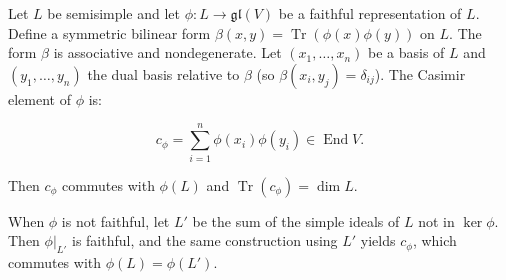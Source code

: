 Let $L$ be semisimple and let $\phi: L \rightarrow \mathfrak{gl}(V)$ be a faithful representation of $L$. Define a symmetric bilinear form $\beta(x, y) = \operatorname{Tr}(\phi(x)\phi(y))$ on $L$. The form $\beta$ is associative and nondegenerate. Let $(x_1, \ldots, x_n)$ be a basis of $L$ and $(y_1, \ldots, y_n)$ the dual basis relative to $\beta$ (so $\beta(x_i, y_j) = \delta_{ij}$). The Casimir element of $\phi$ is:

$$c_\phi = \sum_{i=1}^{n} \phi(x_i)\phi(y_i) \in \operatorname{End} V.$$

Then $c_\phi$ commutes with $\phi(L)$ and $\operatorname{Tr}(c_\phi) = \dim L$.

When $\phi$ is not faithful, let $L'$ be the sum of the simple ideals of $L$ not in $\ker\phi$. Then $\phi|_{L'}$ is faithful, and the same construction using $L'$ yields $c_\phi$, which commutes with $\phi(L) = \phi(L')$.
